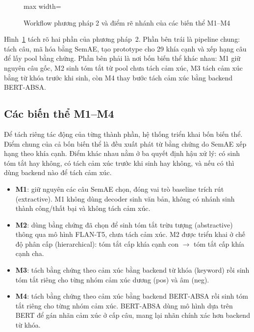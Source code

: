 \documentclass[12pt,a4paper]{report}
\begin{document}
\begin{figure}[tbp]
\begin{adjustbox}{max width=\textwidth}
\end{adjustbox}
\caption{Workflow phương pháp 2 và điểm rẽ nhánh của các biến thể M1--M4}
\label{fig:semae-hasos-pipeline}
\end{figure}

Hình~\ref{fig:semae-hasos-pipeline} tách rõ hai phần của phương pháp~2. Phần bên trái là pipeline chung: tách câu, mã hóa bằng SemAE, tạo prototype cho 29 khía cạnh và xếp hạng câu để lấy pool bằng chứng. Phần bên phải là nơi bốn biến thể khác nhau: M1 giữ nguyên câu gốc, M2 sinh tóm tắt từ pool chưa tách cảm xúc, M3 tách cảm xúc bằng từ khóa trước khi sinh, còn M4 thay bước tách cảm xúc bằng backend BERT-ABSA.

\subsection{Các biến thể M1--M4}

Để tách riêng tác động của từng thành phần, hệ thống triển khai bốn biến thể. Điểm chung của cả bốn biến thể là đều xuất phát từ bằng chứng do SemAE xếp hạng theo khía cạnh. Điểm khác nhau nằm ở ba quyết định hậu xử lý: có sinh tóm tắt hay không, có tách cảm xúc trước khi sinh hay không, và nếu có thì dùng backend nào để tách cảm xúc.

\begin{itemize}[leftmargin=1.2cm]
    \item \textbf{M1}: giữ nguyên các câu SemAE chọn, đóng vai trò baseline trích rút (extractive). M1 không dùng decoder sinh văn bản, không có nhánh sinh thành công/thất bại và không tách cảm xúc.
    \item \textbf{M2}: dùng bằng chứng đã chọn để sinh tóm tắt trừu tượng (abstractive) thông qua mô hình FLAN-T5, chưa tách cảm xúc. M2 được triển khai ở chế độ phân cấp (hierarchical): tóm tắt cấp khía cạnh con $\to$ tóm tắt cấp khía cạnh cha.
    \item \textbf{M3}: tách bằng chứng theo cảm xúc bằng backend từ khóa (keyword) rồi sinh tóm tắt riêng cho từng nhóm cảm xúc dương (pos) và âm (neg).
    \item \textbf{M4}: tách bằng chứng theo cảm xúc bằng backend BERT-ABSA rồi sinh tóm tắt riêng cho từng nhóm cảm xúc. BERT-ABSA dùng mô hình dựa trên BERT để gán nhãn cảm xúc ở cấp câu, mang lại nhãn chính xác hơn backend từ khóa.
\end{itemize}
\end{document}
